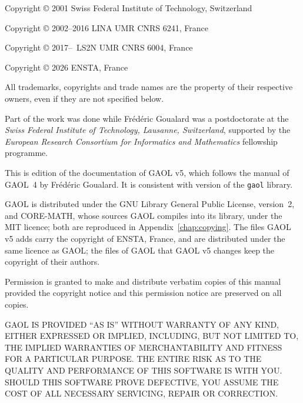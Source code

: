 \documentclass[12pt,a4paper,twoside,openright]{book}
\begin{document}
\begin{copyrighttxt}
Copyright \copyright{} 2001 Swiss Federal Institute of Technology, Switzerland

Copyright \copyright{} 2002--2016 LINA UMR CNRS 6241, France

Copyright \copyright{} 2017--\number\year\ LS2N UMR CNRS 6004, France

Copyright \copyright{} 2026 ENSTA, France

\medskip
All trademarks, copyrights and trade names are the property of their
respective owners, even if they are not specified below.

Part of the work was done while Fr\'ed\'eric Goualard was a postdoctorate at
the \emph{Swiss Federal Institute of Technology, Lausanne, Switzerland},
supported by the \emph{European Research Consortium for Informatics and
Mathematics} fellowship programme.

This is edition \edition{} of the documentation of GAOL v5, which follows the
manual of GAOL~4 by Fr\'ed\'eric Goualard. It is consistent with version
\version{} of the \texttt{gaol} library.

GAOL is distributed under the GNU Library General Public License, version~2,
and CORE-MATH, whose sources GAOL compiles into its library, under the MIT
licence; both are reproduced in Appendix~\ref{chap:copying}. The files GAOL
v5 adds carry the copyright of ENSTA, France, and are distributed under the
same licence as GAOL; the files of GAOL that GAOL v5 changes keep the
copyright of their authors.

Permission is granted to make and distribute verbatim copies of this manual
provided the copyright notice and this permission notice are preserved on all
copies.

\smallskip
GAOL IS PROVIDED ``AS IS'' WITHOUT WARRANTY OF ANY KIND, EITHER EXPRESSED OR
IMPLIED, INCLUDING, BUT NOT LIMITED TO, THE IMPLIED WARRANTIES OF
MERCHAN\-TA\-BILITY AND FITNESS FOR A PARTICULAR PURPOSE. THE ENTIRE RISK AS
TO THE QUALITY AND PERFORMANCE OF THIS SOFTWARE IS WITH YOU. SHOULD THIS
SOFTWARE PRO\-VE DEFECTIVE, YOU ASSUME THE COST OF ALL NECESSARY SERVICING,
REPAIR OR CORRECTION.
\end{copyrighttxt}

\end{document}
